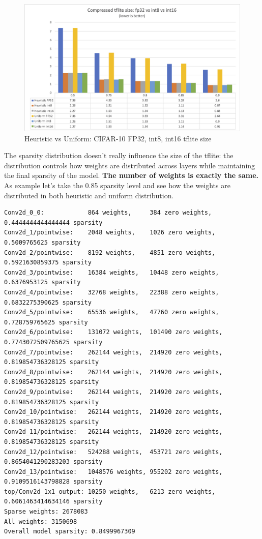 \begin{figure}[ht]
    \includegraphics[width=\linewidth]{images/results/cifar10_tflite_size.png}
    \centering
    \caption{Heuristic vs Uniform: CIFAR-10 FP32, int8, int16 tflite size}\label{fig:cifar10_tflite_size}
\end{figure}

The sparsity distribution doesn't really influence the size of the tflite:
the distribution controls how weights are distributed across layers while
maintaining the final sparsity of the model. \textbf{The number of weights is
exactly the same.}
As example let's take the 0.85 sparsity level and see how the weights are
distributed in both heuristic and uniform distribution.

\begin{lstlisting}[label={lst:heuristic_weights},
    caption=MobileNet v1 and CIFAR-10: heuristic weights distributions]
Conv2d_0_0:            864 weights,     384 zero weights,    0.4444444444444444 sparsity
Conv2d_1/pointwise:    2048 weights,    1026 zero weights,   0.5009765625 sparsity
Conv2d_2/pointwise:    8192 weights,    4851 zero weights,   0.5921630859375 sparsity
Conv2d_3/pointwise:    16384 weights,   10448 zero weights,  0.6376953125 sparsity
Conv2d_4/pointwise:    32768 weights,   22388 zero weights,  0.6832275390625 sparsity
Conv2d_5/pointwise:    65536 weights,   47760 zero weights,  0.728759765625 sparsity
Conv2d_6/pointwise:    131072 weights,  101490 zero weights, 0.7743072509765625 sparsity
Conv2d_7/pointwise:    262144 weights,  214920 zero weights, 0.819854736328125 sparsity
Conv2d_8/pointwise:    262144 weights,  214920 zero weights, 0.819854736328125 sparsity
Conv2d_9/pointwise:    262144 weights,  214920 zero weights, 0.819854736328125 sparsity
Conv2d_10/pointwise:   262144 weights,  214920 zero weights, 0.819854736328125 sparsity
Conv2d_11/pointwise:   262144 weights,  214920 zero weights, 0.819854736328125 sparsity
Conv2d_12/pointwise:   524288 weights,  453721 zero weights, 0.8654041290283203 sparsity
Conv2d_13/pointwise:   1048576 weights, 955202 zero weights, 0.9109516143798828 sparsity
top/Conv2d_1x1_output: 10250 weights,   6213 zero weights,   0.6061463414634146 sparsity
Sparse weights: 2678083
All weights: 3150698
Overall model sparsity: 0.8499967309
\end{lstlisting}


